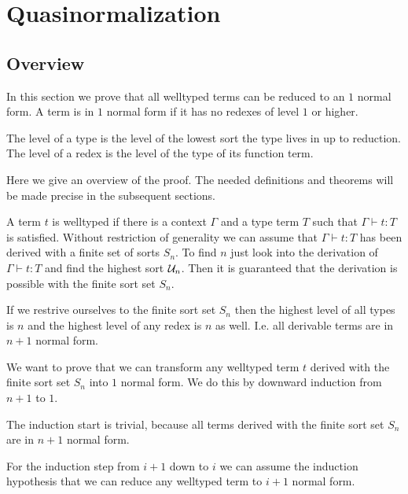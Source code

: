 \section{Quasinormalization}


\subsection{Overview}


In this section we prove that all welltyped terms can be reduced to an $1$
normal form. A term is in $1$ normal form if it has no redexes of level
$1$ or higher.

The level of a type is the level of the lowest sort the type lives in up to
reduction. The level of a redex is the level of the type of its function term.

Here we give an overview of the proof. The needed definitions and theorems will
be made precise in the subsequent sections.

A term $t$ is welltyped if there is a context $\Gamma$ and a type term $T$ such
that $\Gamma \vdash t : T$ is satisfied. Without restriction of generality we
can assume that $\Gamma \vdash t : T$ has been derived with a finite set of
sorts $S_n$. To find $n$ just look into the derivation of $\Gamma \vdash t : T$
and find the highest sort ${\cal U}_n$. Then it is guaranteed that the derivation is
possible with the finite sort set $S_n$.

If we restrive ourselves to the finite sort set $S_n$ then the highest level of
all types is $n$ and the highest level of any redex is $n$ as well.
I.e. all derivable terms are in $n+1$ normal form.

We want to prove that we can transform any welltyped term $t$ derived with the
finite sort set $S_n$ into $1$ normal form. We do this by downward
induction from $n+1$ to $1$.

The induction start is trivial, because all terms derived with the finite sort
set $S_n$ are in $n+1$ normal form.

For the induction step from $i+1$ down to $i$ we can assume the induction
hypothesis that we can reduce any welltyped term to $i+1$ normal form.




